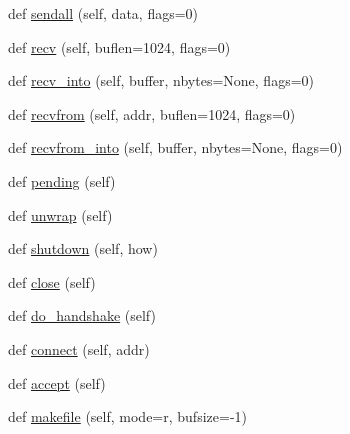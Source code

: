 \begin{DoxyCompactItemize}
\item 
def \mbox{\hyperlink{classforge_1_1ssl_1_1_s_s_l_socket_a33f13aabe22d097cd72825b1e8b07aeb}{sendall}} (self, data, flags=0)
\item 
def \mbox{\hyperlink{classforge_1_1ssl_1_1_s_s_l_socket_a94636100b76ef75be8f44a82bce063f1}{recv}} (self, buflen=1024, flags=0)
\item 
def \mbox{\hyperlink{classforge_1_1ssl_1_1_s_s_l_socket_a0d58a08ffcecf65e60beb9c40a9a03b2}{recv\+\_\+into}} (self, buffer, nbytes=None, flags=0)
\item 
def \mbox{\hyperlink{classforge_1_1ssl_1_1_s_s_l_socket_a7072b7194641fec3058cfd672c6e23b6}{recvfrom}} (self, addr, buflen=1024, flags=0)
\item 
def \mbox{\hyperlink{classforge_1_1ssl_1_1_s_s_l_socket_acd2312d8e4b519fbb5d26fc17b8dfe8d}{recvfrom\+\_\+into}} (self, buffer, nbytes=None, flags=0)
\item 
def \mbox{\hyperlink{classforge_1_1ssl_1_1_s_s_l_socket_a0b6d75de12bff0e99387f6c320a4f80b}{pending}} (self)
\item 
def \mbox{\hyperlink{classforge_1_1ssl_1_1_s_s_l_socket_a40639beecc18c90b8bbac43ec6252451}{unwrap}} (self)
\item 
def \mbox{\hyperlink{classforge_1_1ssl_1_1_s_s_l_socket_a806970ebd19bc4e16374c377a3e7f4a2}{shutdown}} (self, how)
\item 
def \mbox{\hyperlink{classforge_1_1ssl_1_1_s_s_l_socket_a0931f143205a960d3f037491cea25513}{close}} (self)
\item 
def \mbox{\hyperlink{classforge_1_1ssl_1_1_s_s_l_socket_add93497ad9ad1614154f9eff518b2ef9}{do\+\_\+handshake}} (self)
\item 
def \mbox{\hyperlink{classforge_1_1ssl_1_1_s_s_l_socket_ad376e228d79f3f27d01436cc252e2bbf}{connect}} (self, addr)
\item 
def \mbox{\hyperlink{classforge_1_1ssl_1_1_s_s_l_socket_ad217f805c6b78779d7276b2309660bf4}{accept}} (self)
\item 
def \mbox{\hyperlink{classforge_1_1ssl_1_1_s_s_l_socket_a837441ff1f9d4a42537e9948c1762b03}{makefile}} (self, mode=\textquotesingle{}r\textquotesingle{}, bufsize=-\/1)
\end{DoxyCompactItemize}
